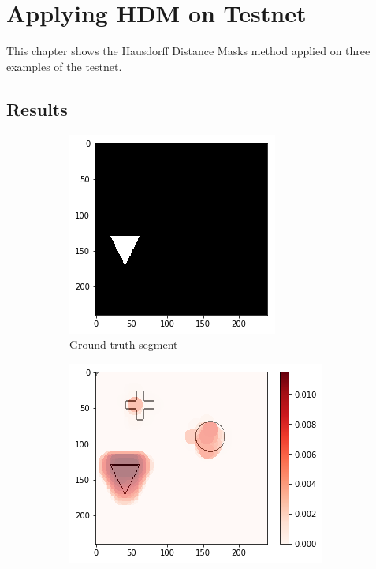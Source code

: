 \clearpage

\section{Applying HDM on Testnet}

This chapter shows the Hausdorff Distance Masks method applied on three examples of the testnet.

\subsection{Results}
\begin{figure}[H]
    \centering
    \begin{subfigure}[t]{.28\textwidth}
        \centering
        \includegraphics[width=\linewidth]{chapters/06_hdm/testnet/0.png}
        \caption{Ground truth segment}
    \end{subfigure}\hfill%
    \begin{subfigure}[t]{.34\textwidth}
        \centering
        \includegraphics[width=\linewidth]{chapters/06_hdm/testnet/2.png}

\end{subfigure}
\end{figure}
